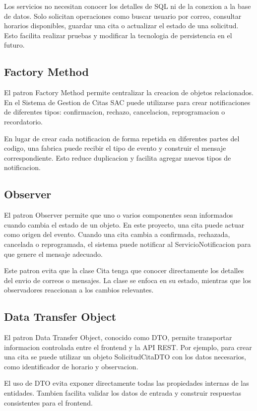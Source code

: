 \documentclass[12pt,letterpaper]{article}
\begin{document}
Los servicios no necesitan conocer los detalles de SQL ni de la conexion a la base de datos. Solo solicitan operaciones como buscar usuario por correo, consultar horarios disponibles, guardar una cita o actualizar el estado de una solicitud. Esto facilita realizar pruebas y modificar la tecnologia de persistencia en el futuro.

\subsection{Factory Method}

El patron Factory Method permite centralizar la creacion de objetos relacionados. En el Sistema de Gestion de Citas SAC puede utilizarse para crear notificaciones de diferentes tipos: confirmacion, rechazo, cancelacion, reprogramacion o recordatorio.

En lugar de crear cada notificacion de forma repetida en diferentes partes del codigo, una fabrica puede recibir el tipo de evento y construir el mensaje correspondiente. Esto reduce duplicacion y facilita agregar nuevos tipos de notificacion.

\subsection{Observer}

El patron Observer permite que uno o varios componentes sean informados cuando cambia el estado de un objeto. En este proyecto, una cita puede actuar como origen del evento. Cuando una cita cambia a confirmada, rechazada, cancelada o reprogramada, el sistema puede notificar al ServicioNotificacion para que genere el mensaje adecuado.

Este patron evita que la clase Cita tenga que conocer directamente los detalles del envio de correos o mensajes. La clase se enfoca en su estado, mientras que los observadores reaccionan a los cambios relevantes.

\subsection{Data Transfer Object}

El patron Data Transfer Object, conocido como DTO, permite transportar informacion controlada entre el frontend y la API REST. Por ejemplo, para crear una cita se puede utilizar un objeto SolicitudCitaDTO con los datos necesarios, como identificador de horario y observacion.

El uso de DTO evita exponer directamente todas las propiedades internas de las entidades. Tambien facilita validar los datos de entrada y construir respuestas consistentes para el frontend.
\end{document}
